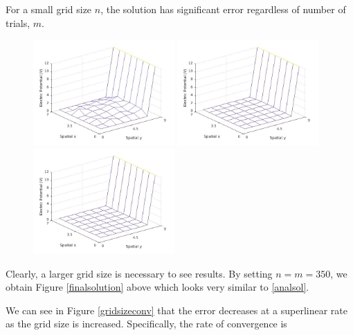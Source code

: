 \documentclass{amsart}
\begin{document}
For a small grid size $n$, the solution has significant error regardless of number of trials, $m$.

\begin{figure}[H]
	\includegraphics[width=0.48\textwidth]{solution_n=8_m=100.jpg}
	\includegraphics[width=0.48\textwidth]{solution_n=8_m=1000.jpg}
	\includegraphics[width=0.48\textwidth]{solution_n=8_m=10000.jpg}
\end{figure}

Clearly, a larger grid size is necessary to see results. By setting $n=m=350$, we obtain Figure \ref{finalsolution} above which looks very similar to \ref{analsol}.

We can see in Figure \ref{gridsizeconv} that the error decreases at a superlinear rate as the grid size is increased. Specifically, the rate of convergence is
\end{document}
